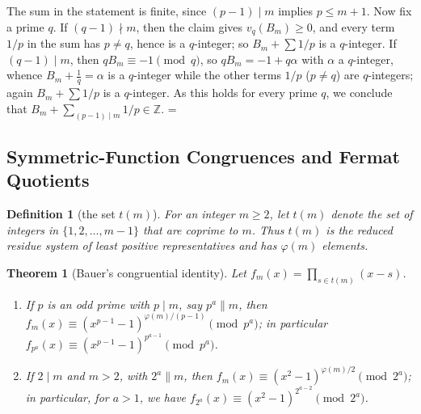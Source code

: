 \documentclass[11pt]{article}
\makeatletter
\theoremstyle{ntstyle}
\newtheorem{theorem}{Theorem}[subsection]
\newtheorem{definition}{Definition}[subsection]
\let\nt@closedisplay\]
\def\nt@guardedclose{\@ifnextchar\par{\nt@closeafterpar}{\@ifnextchar\end{\postdisplaypenalty\@M\nt@closedisplay}{\nt@closedisplay}}}
\def\nt@closeafterpar\par{\@ifnextchar\par{\nt@closeafterpar}{\@ifnextchar\end{\postdisplaypenalty\@M\nt@closedisplay\par}{\nt@closedisplay\par}}}
\renewenvironment{proof}[1][\proofname]{\par
  \pushQED{\qed}\normalfont\topsep\medskipamount\edef\nt@afterproof{\@endparpenalty=\the\@endparpenalty\relax}\@beginparpenalty\@M\@endparpenalty\@M\let\]\nt@guardedclose\trivlist\item[]\textit{#1\@addpunct{.}} \ignorespaces}{\ifvmode\addpenalty\@M\fi\popQED\nt@afterproof\endtrivlist\@endpefalse}
\makeatother
\begin{document}
\begin{proof}
	The sum in the statement is finite, since $(p-1)\mid m$ implies $p\le m+1$.
		Now fix a prime $q$.
		If $(q-1) \nmid m$, then the claim gives $v_q(B_m) \ge 0$, and every term $1/p$ in the sum has $p
		\neq q$, hence is a $q$-integer; so $B_m + \sum 1/p$ is a $q$-integer.
		If $(q-1) \mid m$, then $q B_m \equiv -1 \pmod{q}$, so $q B_m = -1 + q\alpha$ with $\alpha$ a
		$q$-integer, whence $B_m + \tfrac{1}{q} = \alpha$ is a $q$-integer while the other terms $1/p$
		($p \neq q$) are $q$-integers; again $B_m + \sum 1/p$ is a $q$-integer.
		As this holds for every prime $q$, we conclude that $B_m + \sum_{(p-1) \mid m} 1/p \in \mathbb{Z}$.
\end{proof}
\subsection{Symmetric-Function Congruences and Fermat Quotients}

\begin{definition}[the set $t(m)$]\label{def:6.9.1}
	For an integer $m\ge2$, let $t(m)$ denote the set of integers in
	$\{1,2,\ldots,m-1\}$ that are coprime to $m$. Thus $t(m)$ is the
	reduced residue system of least positive representatives and has
	$\varphi(m)$ elements.
\end{definition}
\begin{theorem}[Bauer's congruential identity]\label{thm:6.9.1} Let
	$f_m(x) = \prod_{s \in t(m)}(x - s)$.

	\begin{enumerate}[label={\alph*)}]
		\item If $p$ is an odd prime with $p\mid m$, say $p^{a} \parallel m$, then $f_m(x)
						\equiv (x^{p-1} - 1)^{\varphi(m)/(p-1)} \pmod{p^{a}}$; in particular
					$f_{p^{a}}(x) \equiv (x^{p-1} - 1)^{p^{a-1}} \pmod{p^{a}}$.
		\item If $2 \mid m$ and $m > 2$, with $2^{a} \parallel m$, then $f_m(x)
						\equiv (x^{2} - 1)^{\varphi(m)/2} \pmod{2^{a}}$; in particular, for
					$a > 1$, we have $f_{2^{a}}(x) \equiv (x^{2} - 1)^{2^{a-2}} \pmod{2^{a}}$.
	\end{enumerate}
\end{theorem}
\end{document}
